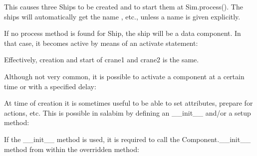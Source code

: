\documentclass[letterpaper,10pt,english]{sphinxmanual}
\begin{document}
This causes three Ships to be created and to start them at Sim.process().
The ships will automatically get the name , etc., unless a name
is given explicitly.

If no process method is found for Ship, the ship will be a data component.
In that case, it becomes active by means of an activate statement:

\begin{sphinxVerbatim}[commandchars=\\\{\}]
 
     
         

  

  
\end{sphinxVerbatim}

Effectively, creation and start of crane1 and crane2 is the same.

Although not very common, it is possible to activate a component at a certain time or with a
specified delay:

\begin{sphinxVerbatim}[commandchars=\\\{\}]
\end{sphinxVerbatim}

At time of creation it is sometimes useful to be able to set attributes, prepare for actions, etc.
This is possible in salabim by defining an \_\_init\_\_ and/or a setup method:

If the \_\_init\_\_ method is used, it is required to call the Component.\_\_init\_\_ method from within the
overridden method:
\end{document}
